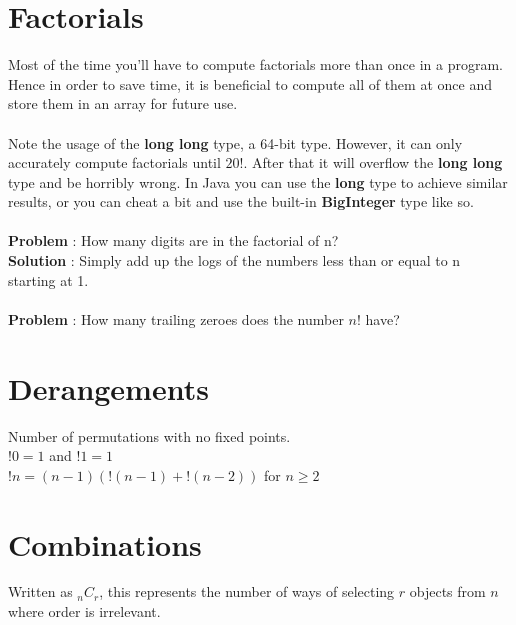 	\section{Factorials}
	    \indent Most of the time you'll have to compute factorials more than once in a 
	    program. Hence in order to save time, it is beneficial to compute all of
	     them at once and store them in an array for future use. \\
		
		\ \\
		\indent Note the usage of the {\bf long long} type, a 64-bit type. However, it 
		can only accurately compute factorials until $20!$. After that it will 
		overflow the {\bf long long} type and be horribly wrong. In Java you can
		 use the {\bf long} type to achieve similar results, or you can cheat a 
		 bit and use the built-in {\bf BigInteger} type like so. \\
		 
		 \ \\
		 {\bf Problem} : How many digits are in the factorial of n? \\
		 {\bf Solution} : Simply add up the logs of the numbers less than or equal to n starting at 1. \\
		 
		 \ \\
		 {\bf Problem} : How many trailing zeroes does the number $n!$ have? \\
		 
		 
	\section{Derangements}
	Number of permutations with no fixed points. \\
	\indent $!0 = 1$ and $!1 = 1$ \\
	\indent $!n = (n-1)(!(n-1) + !(n-2))$ for $n \ge 2$
	
	\section{Combinations}
	Written as ${_n}C_r$, this represents the number of ways of selecting $r$ 
	objects from $n$ where order is irrelevant.
	
